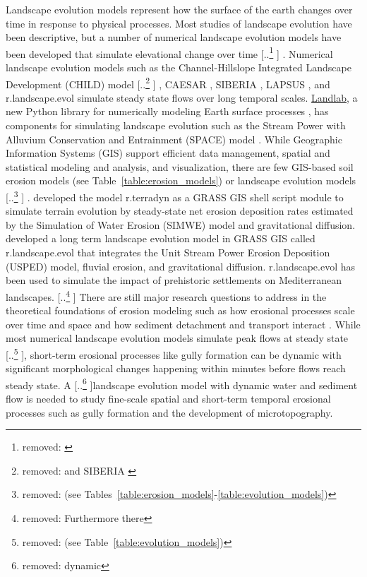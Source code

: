 \documentclass[gmd, manuscript]{copernicus}
\providecommand{\DIFadd}[1]{{\protect\color{blue} \sf #1}} %
\providecommand{\DIFdel}[1]{{\protect\color{red} [..\footnote{removed: #1} ]}} %
\providecommand{\DIFaddbegin}{} %
\providecommand{\DIFaddend}{} %
\providecommand{\DIFdelbegin}{} %
\providecommand{\DIFdelend}{} %
\begin{document}
\introduction
Landscape evolution models represent how the surface of the earth changes 
over time in response to physical processes. 
Most studies of landscape evolution have been descriptive, 
but a number of numerical landscape evolution models 
have been developed that simulate elevational change over time 
\DIFdelbegin \DIFdel{\citep{Temme2013}}\DIFdelend \DIFaddbegin \DIFadd{\citep{Tucker2010,Temme2013}}\DIFaddend . 
Numerical landscape evolution models
such as the Channel-Hillslope Integrated Landscape Development (CHILD) model 
\citep{Tucker2001}\DIFdelbegin \DIFdel{and SIBERIA \citep{Willgoose2005}}\DIFdelend \DIFaddbegin \DIFadd{,
CAESAR \citep{Coulthard2002,Coulthard2012},
SIBERIA \citep{Willgoose2005},
LAPSUS \citep{Schoorl2000,Schoorl2002},
and r.landscape.evol \citep{Barton2010}
}\DIFaddend simulate steady state flows over long temporal scales.
\href{http://landlab.github.io/}{Landlab},
a new Python library for numerically modeling Earth surface processes
\citep{Hobley2017},
has components for simulating landscape evolution such as the 
Stream Power with Alluvium Conservation and Entrainment (SPACE) 
model \citep{Shobe2017}.
While Geographic Information Systems (GIS)
support efficient data management, 
spatial and statistical modeling and analysis, 
and visualization,
there are few GIS-based soil erosion models \DIFaddbegin \DIFadd{(see Table~\ref{table:erosion_models})
}\DIFaddend or landscape evolution models\DIFdelbegin \DIFdel{(see Tables~\ref{table:erosion_models}-\ref{table:evolution_models}) }\DIFdelend \DIFaddbegin \DIFadd{.
\cite{Thaxton2004} developed the model r.terradyn as a GRASS GIS shell script module 
to simulate terrain evolution by steady-state net erosion deposition rates
estimated by the Simulation of Water Erosion (SIMWE) model \citep{Mitas1998}
and gravitational diffusion. 
\cite{Barton2010} developed a long term landscape evolution model
in GRASS GIS called r.landscape.evol that integrates 
the Unit Stream Power Erosion Deposition (USPED) model,
fluvial erosion, and gravitational diffusion.
r.landscape.evol has been used to simulate the impact 
of prehistoric settlements on Mediterranean landscapes}\DIFaddend .
\DIFdelbegin \DIFdel{Furthermore there }\DIFdelend \DIFaddbegin \DIFadd{There }\DIFaddend are still major research questions 
to address in the theoretical foundations of erosion modeling 
such as how erosional processes scale over time and space 
and how sediment detachment and transport interact \citep{Mitasova2013}. 
While most numerical landscape evolution models 
simulate peak flows at steady state\DIFdelbegin \DIFdel{(see Table~\ref{table:evolution_models})}\DIFdelend ,
short-term erosional processes like gully formation can be dynamic
with significant morphological changes happening within minutes
before flows reach steady state. 
A \DIFdelbegin \DIFdel{dynamic }\DIFdelend landscape evolution model \DIFaddbegin \DIFadd{with dynamic water and sediment flow
}\DIFaddend is needed to study fine-scale spatial and short-term temporal erosional processes
such as gully formation and the development of microtopography. 
\end{document}
